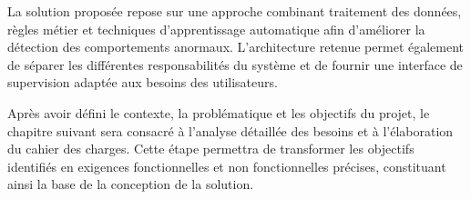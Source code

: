 La solution proposée repose sur une approche combinant traitement des
données, règles métier et techniques d'apprentissage automatique afin
d'améliorer la détection des comportements anormaux. L'architecture retenue
permet également de séparer les différentes responsabilités du système et
de fournir une interface de supervision adaptée aux besoins des utilisateurs.

Après avoir défini le contexte, la problématique et les objectifs du projet,
le chapitre suivant sera consacré à l'analyse détaillée des besoins et à
l'élaboration du cahier des charges. Cette étape permettra de transformer
les objectifs identifiés en exigences fonctionnelles et non fonctionnelles
précises, constituant ainsi la base de la conception de la solution.